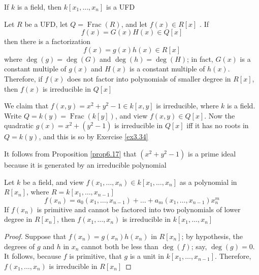 \documentclass[11pt]{article}
\DeclareMathOperator{\Frac}{Frac}
\begin{document}
\begin{corollary}[]
If \(k\) is a field, then \(k[x_1,\dots,x_n]\) is a UFD
\end{corollary}

\begin{corollary}[Gauss]
\label{ncor5.28}
Let \(R\) be a UFD, let \(Q=\Frac(R)\), and let \(f(x)\in R[x]\) . If 
\begin{equation*}
f(x)=G(x)H(x)\in Q[x]
\end{equation*}
then there is a factorization
\begin{equation*}
f(x)=g(x)h(x)\in R[x]
\end{equation*}
where \(\deg(g)=\deg(G)\) and \(\deg(h)=\deg(H)\); in fact, \(G(x)\) is a
constant multiple of \(g(x)\) and \(H(x)\) is a constant multiple of
\(h(x)\). Therefore, if \(f(x)\) does not factor into polynomials of smaller
degree in \(R[x]\), then \(f(x)\) is irreducible in \(Q[x]\)
\end{corollary}

\begin{examplle}[]
We claim that \(f(x,y)=x^2+y^2-1\in k[x,y]\) is irreducible, where \(k\) is a
field. Write \(Q=k(y)=\Frac(k[y])\), and view \(f(x,y)\in Q[x]\). Now the
quadratic \(g(x)=x^2+(y^2-1)\) is irreducible in \(Q[x]\) iff it has no roots
in \(Q=k(y)\), and this is so by Exercise \ref{ex3.34}

It follows from Proposition \ref{prop6.17} that \((x^2+y^2-1)\) is a prime
ideal because it is generated by an irreducible polynomial
\end{examplle}

\begin{proposition}[]
\label{nprop5.30}
Let \(k\) be a field, and view \(f(x_1,\dots,x_n)\in k[x_1,\dots,x_n]\) as a
polynomial in \(R[x_n]\), where \(R=k[x_1,\dots,x_{n-1}]\)
\begin{equation*}
f(x_n)=a_0(x_1,\dots,x_{n-1})+\dots+a_m(x_1,\dots,x_{n-1})x^m_n
\end{equation*}
If \(f(x_n)\) is primitive and cannot be factored into two polynomials of
lower degree in \(R[x_n]\), then \(f(x_1,\dots,x_n)\) is irreducible in
\(k[x_1,\dots,x_n]\) 
\end{proposition}

\begin{proof}
Suppose that \(f(x_n)=g(x_n)h(x_n)\) in \(R[x_n]\); by hypothesis, the
degrees of \(g\) and \(h\) in \(x_n\) cannot both be less than \(\deg(f)\); say,
\(\deg(g)=0\). It follows, because \(f\) is primitive, that \(g\) is a unit in
\(k[x_1,\dots,x_{n-1}]\). Therefore, \(f(x_1,\dots,x_n)\) is irreducible in \(R[x_n]\)
\end{proof}
\end{document}
